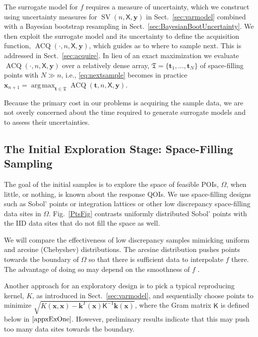 \documentclass[11pt]{NSFamsart}
\DeclareMathOperator*{\argmax}{arg\,max}
\DeclareMathOperator{\SVAR}{SV} %
\DeclareMathOperator{\VAL}{ACQ}
\newcommand{\mK}{\mathsf{K}}
\newcommand{\mX}{\mathsf{X}}
\newcommand{\bx}{{\boldsymbol{x}}}
\newcommand{\bk}{{\boldsymbol{k}}}
\newcommand{\by}{{\boldsymbol{y}}}
\newcommand{\bt}{{\boldsymbol{t}}}
\newcommand{\ct}{\mathfrak{T}}
\begin{document}
The surrogate model for $f$ requires a measure of uncertainty, which we construct using uncertainty measures for $\SVAR(n,\mX,\by)$ in Sect.\ \ref{sec:varmodel} combined with a Bayesian bootstrap resampling in Sect.\ \ref{sec:BayesianBootUncertainty}. We then exploit the surrogate model and its uncertainty to define the acquisition function, $\VAL(\cdot, n,\mX,\by)$, which guides as to where to sample next. This is addressed in Sect.\ \ref{sec:acquire}. In lieu of an exact maximization we evaluate $\VAL(\cdot, n,\mX,\by)$ over a relatively dense array, $\ct = \{\bt_1, \ldots, \bt_N\}$ of  space-filling points with $N \gg n$, i.e., \eqref{eq:nextsample} becomes in practice $\bx_{n+1} = \argmax_{\bt \in \ct} \VAL(\bt, n,\mX,\by)$.

Because the primary cost in our problems is acquiring the sample data, we are not overly concerned about the time required to generate surrogate models and to assess their uncertainties.


\subsection{The Initial Exploration Stage: Space-Filling Sampling} \label{sec:Explore}


The goal of the initial samples is to explore the space of feasible POIs, $\Omega$, when little, or nothing, is known about the response QOIs. We use space-filling designs such as Sobol' points \cite{DicPil10a} or integration lattices \cite{SloJoe94, DicEtal14a} or other low discrepancy space-filling data sites \cite{DicPil10a} in $\Omega$.  Fig.\ \ref{PtsFig} contrasts uniformly distributed Sobol' points with the IID data sites that do not fill the space as well.

We will compare the effectiveness of low discrepancy samples mimicking uniform and arcsine (Chebyshev) distributions.
The arcsine distribution pushes points towards the boundary of $\Omega$ so that there is sufficient data to interpolate $f$ there.  The advantage of doing so may depend on the smoothness of $f$ \cite{HicLi12a}.

Another approach for an exploratory design is to pick a typical reproducing kernel, $K$, as introduced in Sect.\ \ref{sec:varmodel}, and sequentially choose points to minimize $\sqrt{K(\bx,\bx) - \bk^T(\bx) \mK^{-1} \bk(\bx)}$, where the Gram matrix $\mK$ is defined below in $\eqref{appxExOne}$.  However, preliminary results indicate that this may push too many data sites towards the boundary.
\end{document}
